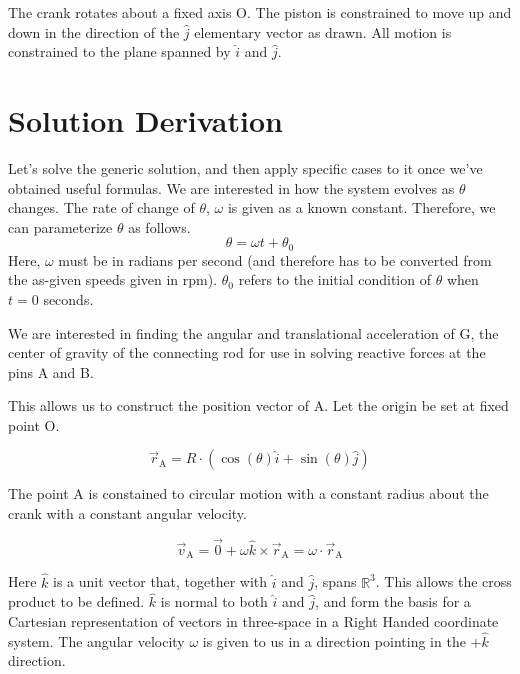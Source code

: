 \documentclass[nofoot,pdf-a,balance,colorlinks,upint,subscriptcorrection,varvw,mathalfa=cal=boondoxo]{asmeconf}
\begin{document}
    The crank rotates about a fixed axis O. The piston is constrained to move up and down in the direction of the $\hat{j}$ elementary vector as drawn. All motion is constrained to the plane spanned by $\hat{i}$ and $\hat{j}$.


    \section{Solution Derivation}

    Let's solve the generic solution, and then apply specific cases to it once we've obtained useful formulas. We are interested in how the system evolves as $\theta$ changes. The rate of change of $\theta$, $\omega$ is given as a known constant. Therefore, we can parameterize $\theta$ as follows.
    \begin{equation} 
        \theta = \omega t + \theta_0
    \end{equation}
    Here, $\omega$ must be in radians per second (and therefore has to be converted from the as-given speeds given in rpm). $\theta_0$ refers to the initial condition of $\theta$ when $t = 0$ seconds.

    We are interested in finding the angular and translational acceleration of G, the center of gravity of the connecting rod for use in solving reactive forces at the pins A and B.


    This allows us to construct the position vector of A. Let the origin be set at fixed point O.

    \begin{equation} 
        \vec{r}_{\textrm{A}} = R\cdot\left(\cos{\left(\theta\right)}\hat{i} + \sin{\left(\theta\right)}\hat{j}\right)
    \end{equation}


    The point A is constained to circular motion with a constant radius about the crank with a constant angular velocity.

    \begin{equation} 
        \vec{v}_{\textrm{A}} = \vec{0} + \omega\hat{k}\times\vec{r}_{\textrm{A}} = \omega\cdot\vec{r}_{\textrm{A}}
    \end{equation}


    Here $\hat{k}$ is a unit vector that, together with $\hat{i}$ and $\hat{j}$, spans $\mathbb{R}^3$. This allows the cross product to be defined. $\hat{k}$ is normal to both $\hat{i}$ and $\hat{j}$, and form the basis for a Cartesian representation of vectors in three-space in a Right Handed coordinate system. The angular velocity $\omega$ is given to us in a direction pointing in the $+\hat{k}$ direction.
\end{document}
